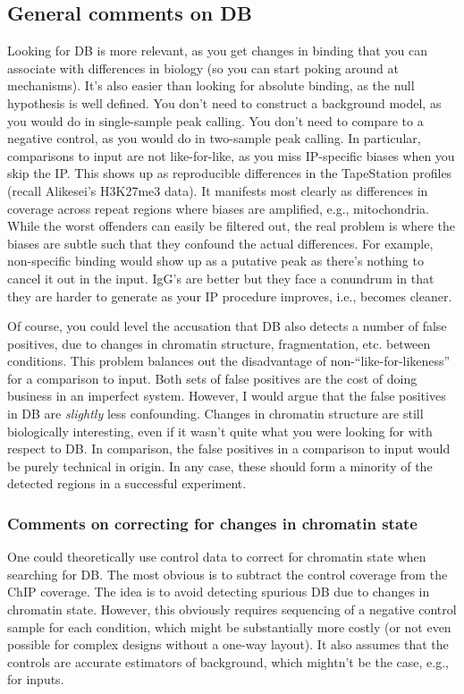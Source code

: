 \documentclass[12pt]{report}
\begin{document}
\subsection*{General comments on DB}

Looking for DB is more relevant, as you get changes in binding that you can associate with differences in biology (so you can start poking around at mechanisms). 
It's also easier than looking for absolute binding, as the null hypothesis is well defined.
You don't need to construct a background model, as you would do in single-sample peak calling.
You don't need to compare to a negative control, as you would do in two-sample peak calling.
In particular, comparisons to input are not like-for-like, as you miss IP-specific biases when you skip the IP.
This shows up as reproducible differences in the TapeStation profiles (recall Alikesei's H3K27me3 data).
It manifests most clearly as differences in coverage across repeat regions where biases are amplified, e.g., mitochondria.
While the worst offenders can easily be filtered out, the real problem is where the biases are subtle such that they confound the actual differences.
For example, non-specific binding would show up as a putative peak as there's nothing to cancel it out in the input.
IgG's are better but they face a conundrum in that they are harder to generate as your IP procedure improves, i.e., becomes cleaner.

Of course, you could level the accusation that DB also detects a number of false positives, due to changes in chromatin structure, fragmentation, etc. between conditions.
This problem balances out the disadvantage of non-``like-for-likeness'' for a comparison to input.
Both sets of false positives are the cost of doing business in an imperfect system.
However, I would argue that the false positives in DB are \textit{slightly} less confounding.
Changes in chromatin structure are still biologically interesting, even if it wasn't quite what you were looking for with respect to DB.
In comparison, the false positives in a comparison to input would be purely technical in origin. 
In any case, these should form a minority of the detected regions in a successful experiment.

\subsubsection{Comments on correcting for changes in chromatin state}

One could theoretically use control data to correct for chromatin state when searching for DB. 
The most obvious is to subtract the control coverage from the ChIP coverage.
The idea is to avoid detecting spurious DB due to changes in chromatin state.
However, this obviously requires sequencing of a negative control sample for each condition, which might be substantially more costly (or not even possible for complex designs without a one-way layout).
It also assumes that the controls are accurate estimators of background, which mightn't be the case, e.g., for inputs.
\end{document}
